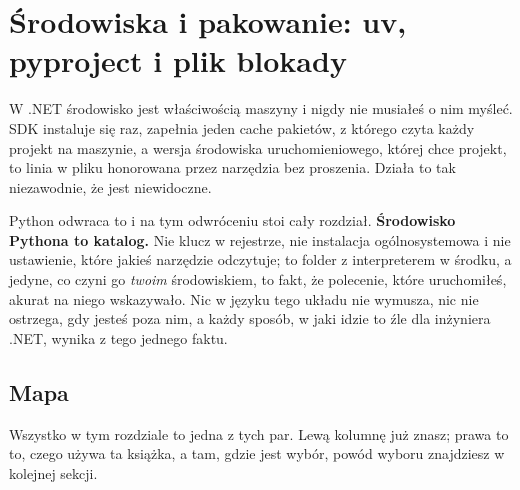 
\chapter{Środowiska i pakowanie: uv, pyproject i plik blokady}
\label{ch:packaging}

\noindent
W .NET środowisko jest właściwością maszyny i nigdy nie musiałeś o nim
myśleć. SDK instaluje się raz,  zapełnia jeden cache
pakietów, z którego czyta każdy projekt na maszynie, a wersja środowiska
uruchomieniowego, której chce projekt, to linia w pliku honorowana przez
narzędzia bez proszenia. Działa to tak niezawodnie, że jest niewidoczne.

Python odwraca to i na tym odwróceniu stoi cały rozdział.
\textbf{Środowisko Pythona to katalog.} Nie klucz w rejestrze, nie instalacja
ogólnosystemowa i nie ustawienie, które jakieś narzędzie odczytuje; to folder
z interpreterem w środku, a jedyne, co czyni go \emph{twoim} środowiskiem, to
fakt, że polecenie, które uruchomiłeś, akurat na niego wskazywało. Nic w
języku tego układu nie wymusza, nic nie ostrzega, gdy jesteś poza nim, a każdy
sposób, w jaki idzie to źle dla inżyniera .NET, wynika z tego jednego faktu.

\section{Mapa}
\label{sec:ch02-map}

\noindent
Wszystko w tym rozdziale to jedna z tych par. Lewą kolumnę już znasz; prawa to
to, czego używa ta książka, a tam, gdzie jest wybór, powód wyboru znajdziesz w
kolejnej sekcji.

